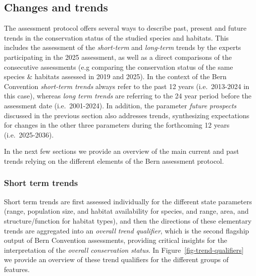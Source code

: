 \documentclass[
  letterpaper,
  DIV=11,
  numbers=noendperiod]{scrartcl}
\begin{document}
\subsection{Changes and trends}\label{changes-and-trends}

The assessment protocol offers several ways to describe past, present
and future trends in the conservation status of the studied species and
habitats. This includes the assessment of the \emph{short-term} and
\emph{long-term} trends by the experts participating in the 2025
assessment, as well as a direct comparisons of the consecutive
assessments (e.g comparing the conservation status of the same species
\& habitats assessed in 2019 and 2025). In the context of the Bern
Convention \emph{short-term trends} always refer to the past 12 years
(i.e.~2013-2024 in this case), whereas \emph{long term trends} are
referring to the 24 year period before the assessment date
(i.e.~2001-2024). In addition, the parameter \emph{future prospects}
discussed in the previous section also addresses trends, synthesizing
expectations for changes in the other three parameters during the
forthcoming 12 years (i.e.~2025-2036).

In the next few sections we provide an overview of the main current and
past trends relying on the different elements of the Bern assessment
protocol.

\subsubsection{Short term trends}\label{short-term-trends}

Short term trends are first assessed individually for the different
state parameters (range, population size, and habitat availability for
species, and range, area, and structure/function for habitat types), and
then the directions of these elementary trends are aggregated into an
\emph{overall trend qualifier}, which is the second flagship output of
Bern Convention assessments, providing critical insights for the
interpretation of the \emph{overall conservation status}. In
Figure~\ref{fig-trend-qualifiers} we provide an overview of these trend
qualifiers for the different groups of features.
\end{document}
